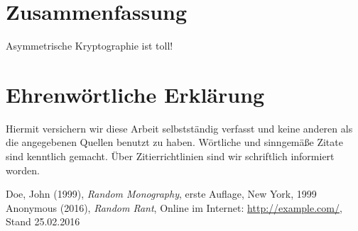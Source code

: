 \documentclass[a4paper, fontsize=12pt, parskip=full, toc=bibliographynumbered]{scrreprt}
\begin{document}
\author{}
\chapter{Zusammenfassung}

Asymmetrische Kryptographie ist toll!

\author{}
\chapter{Ehrenwörtliche Erklärung}

Hiermit versichern wir diese Arbeit selbstständig verfasst und keine
anderen als die angegebenen Quellen benutzt zu haben.  Wörtliche und
sinngemäße Zitate sind kenntlich gemacht.  Über Zitierrichtlinien
sind wir schriftlich informiert worden.

\renewcommand{\bibname}{Quellenverzeichnis}
\begin{thebibliography}{9}
 Doe, John (1999), \emph{Random Monography}, erste
  Auflage, New York, 1999
 Anonymous (2016), \emph{Random Rant}, Online im
  Internet: \url{http://example.com/}, Stand 25.02.2016
\end{thebibliography}
\end{document}
